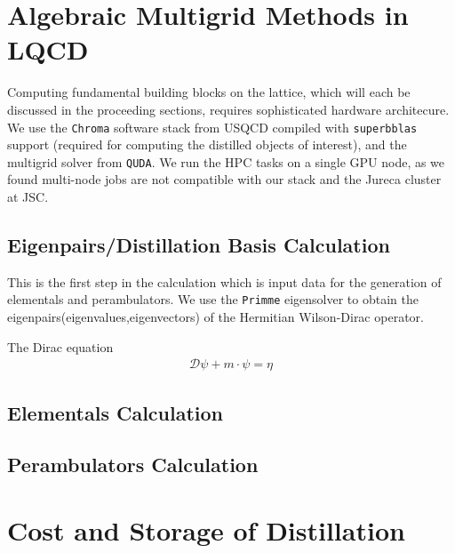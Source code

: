 \section{Algebraic Multigrid Methods in LQCD}
Computing fundamental building blocks on the lattice, which will each be discussed in the proceeding sections, requires sophisticated hardware architecure. We use the \verb|Chroma| software stack from USQCD \cite{Edwards_2005} compiled with \verb|superbblas| support (required for computing the distilled objects of interest), and the multigrid solver from \verb|QUDA|. We run the HPC tasks on a single GPU node, as we found multi-node jobs are not compatible with our stack and the Jureca cluster at JSC. 

\subsection{Eigenpairs/Distillation Basis Calculation}
This is the first step in the calculation which is input data for the generation of elementals and perambulators. We use the \verb|Primme| eigensolver to obtain the eigenpairs(eigenvalues,eigenvectors) of the Hermitian Wilson-Dirac operator\cite{PRIMME}\cite{Frommer:2020ovr}. 

The Dirac equation 
\begin{align}
  \mathcal{D}\psi + m \cdot \psi = \eta
\end{align}


\subsection{Elementals Calculation}

\subsection{Perambulators Calculation}

\section{Cost and Storage of Distillation}
      \vspace{1em}
       
